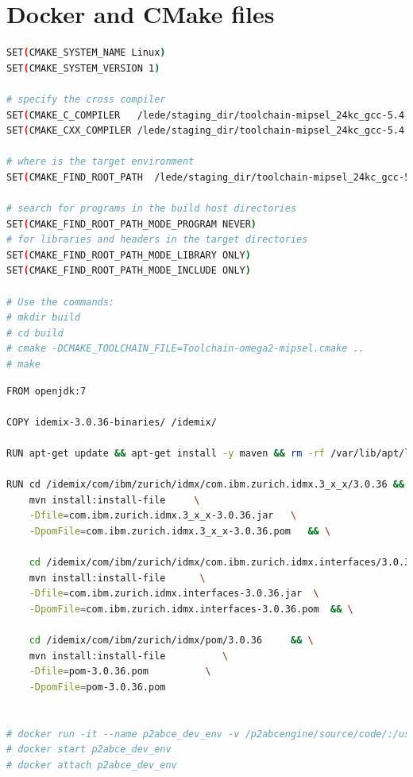 
\chapter{Docker and CMake files}\label{ch:docker}

\begin{lstlisting}[language=bash,frame=tb,caption={Dockerfile for P2ABCE},label=lst:cmakeCrossFiles]
SET(CMAKE_SYSTEM_NAME Linux)
SET(CMAKE_SYSTEM_VERSION 1)

# specify the cross compiler
SET(CMAKE_C_COMPILER   /lede/staging_dir/toolchain-mipsel_24kc_gcc-5.4.0_musl/bin/mipsel-openwrt-linux-gcc)
SET(CMAKE_CXX_COMPILER /lede/staging_dir/toolchain-mipsel_24kc_gcc-5.4.0_musl/bin/mipsel-openwrt-linux-g++)

# where is the target environment 
SET(CMAKE_FIND_ROOT_PATH  /lede/staging_dir/toolchain-mipsel_24kc_gcc-5.4.0_musl)

# search for programs in the build host directories
SET(CMAKE_FIND_ROOT_PATH_MODE_PROGRAM NEVER)
# for libraries and headers in the target directories
SET(CMAKE_FIND_ROOT_PATH_MODE_LIBRARY ONLY)
SET(CMAKE_FIND_ROOT_PATH_MODE_INCLUDE ONLY) 

# Use the commands:
# mkdir build
# cd build
# cmake -DCMAKE_TOOLCHAIN_FILE=Toolchain-omega2-mipsel.cmake ..
# make
\end{lstlisting}

\hfil

\begin{lstlisting}[language=bash,frame=tb,caption={Dockerfile for P2ABCE},label=lst:dockerP2ABCE]
FROM openjdk:7

COPY idemix-3.0.36-binaries/ /idemix/

RUN apt-get update && apt-get install -y maven && rm -rf /var/lib/apt/lists/*

RUN	cd /idemix/com/ibm/zurich/idmx/com.ibm.zurich.idmx.3_x_x/3.0.36 && \
	mvn install:install-file     \
	-Dfile=com.ibm.zurich.idmx.3_x_x-3.0.36.jar   \
	-DpomFile=com.ibm.zurich.idmx.3_x_x-3.0.36.pom   && \
	
	cd /idemix/com/ibm/zurich/idmx/com.ibm.zurich.idmx.interfaces/3.0.36  && \
	mvn install:install-file      \
	-Dfile=com.ibm.zurich.idmx.interfaces-3.0.36.jar  \
	-DpomFile=com.ibm.zurich.idmx.interfaces-3.0.36.pom  && \
	
	cd /idemix/com/ibm/zurich/idmx/pom/3.0.36     && \
	mvn install:install-file          \
	-Dfile=pom-3.0.36.pom          \
	-DpomFile=pom-3.0.36.pom


# docker run -it --name p2abce_dev_env -v /p2abcengine/source/code/:/usr/src/mymaven -w /usr/src/mymaven/Code/core-abce p2abce_env bash
# docker start p2abce_dev_env
# docker attach p2abce_dev_env
\end{lstlisting}

